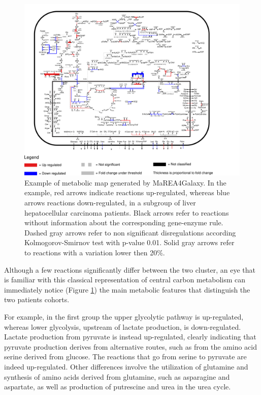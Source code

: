 \documentclass[preprint,12pt,authoryear]{elsarticle}
\newcommand{\mareagalaxy}{\textsf{MaREA4Galaxy}}
\begin{document}
\begin{figure}[ht]
    \includegraphics[width=1\textwidth]{figs/map.pdf}
	\caption{Example of metabolic map generated by \mareagalaxy. In the example, red arrows indicate reactions up-regulated, whereas blue arrows reactions down-regulated, in a subgroup of liver hepatocellular carcinoma patients. Black arrows refer to reactions without information about the corresponding gene-enzyme rule. Dashed gray arrows refer to non significant disregulations according Kolmogorov-Smirnov test with p-value 0.01. Solid gray arrows refer to reactions with a variation lower then 20\%.}
	\label{fig:map}
\end{figure}

Although a few reactions significantly differ between the two cluster, an eye that is familiar with this classical representation of central carbon metabolism can immediately notice (Figure \ref{fig:map}) the main metabolic features that distinguish the two patients cohorts.

For example, in the first group the upper glycolytic pathway is up-regulated, whereas lower glycolysis, upstream of lactate production, is down-regulated. Lactate production from pyruvate is instead up-regulated, clearly indicating that pyruvate production derives from alternative routes, such as from the amino acid serine derived from glucose. The reactions that go from serine to pyruvate are indeed up-regulated. Other differences involve the utilization of glutamine and synthesis of amino acids derived from glutamine, such as asparagine and aspartate, as well as production of putrescine and urea in the urea cycle.
\end{document}
